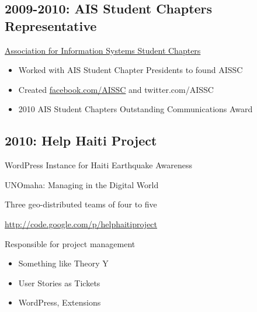 \documentclass[letter,,openany,oneside]{sphinxhowto}
\begin{document}
\subsection{2009-2010: AIS Student Chapters Representative}
\label{resume:ais-student-chapters-representative}
\begin{DUlineblock}{0em}
\item[] \href{http://sc.aisnet.org/}{Association for Information Systems Student Chapters}
\end{DUlineblock}
\begin{itemize}
\item {} 
Worked with AIS Student Chapter Presidents to found AISSC

\item {} 
Created \href{https://www.facebook.com/AISSC}{facebook.com/AISSC} and
twitter.com/AISSC

\item {} 
2010 AIS Student Chapters Outstanding Communications Award

\end{itemize}


\subsection{2010: Help Haiti Project}
\label{resume:help-haiti-project}
\begin{DUlineblock}{0em}
\item[] WordPress Instance for Haiti Earthquake Awareness
\item[] UNOmaha: Managing in the Digital World
\item[] Three geo-distributed teams of four to five
\item[] \href{http://code.google.com/p/helphaitiproject}{http://code.google.com/p/helphaitiproject}
\end{DUlineblock}

Responsible for project management
\begin{itemize}
\item {} 
Something like Theory Y

\item {} 
User Stories as Tickets

\item {} 
WordPress, Extensions

\end{itemize}
\end{document}
